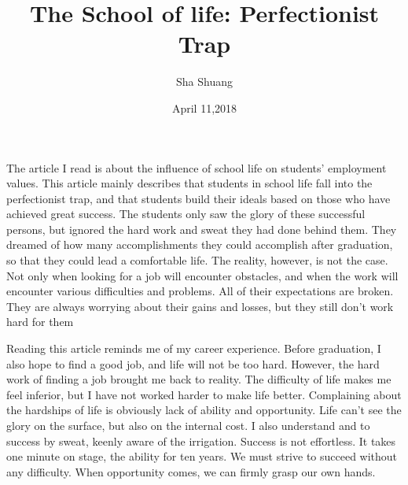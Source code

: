 \documentclass{article}
\author{Sha Shuang}
\date{April 11,2018}
\title{The School of life: Perfectionist Trap}
\begin{document}
\maketitle


The article I read is about the influence of school life on students' employment values. This article mainly describes that students in school life fall into the perfectionist trap, and that students build their ideals based on those who have achieved great success. The students only saw the glory of these successful persons, but ignored the hard work and sweat they had done behind them. They dreamed of how many accomplishments they could accomplish after graduation, so that they could lead a comfortable life. The reality, however, is not the case. Not only when looking for a job will encounter obstacles, and when the work will encounter various difficulties and problems. All of their expectations are broken. They are always worrying about their gains and losses, but they still don't work hard for them


Reading this article reminds me of my career experience. Before graduation, I also hope to find a good job, and life will not be too hard. However, the hard work of finding a job brought me back to reality. The difficulty of life makes me feel inferior, but I have not worked harder to make life better. Complaining about the hardships of life is obviously lack of ability and opportunity. Life can't see the glory on the surface, but also on the internal cost. I also understand and to success by sweat, keenly aware of the irrigation. Success is not effortless. It takes one minute on stage, the ability for ten years. We must strive to succeed without any difficulty. When opportunity comes, we can firmly grasp our own hands.
  
\end{document}

